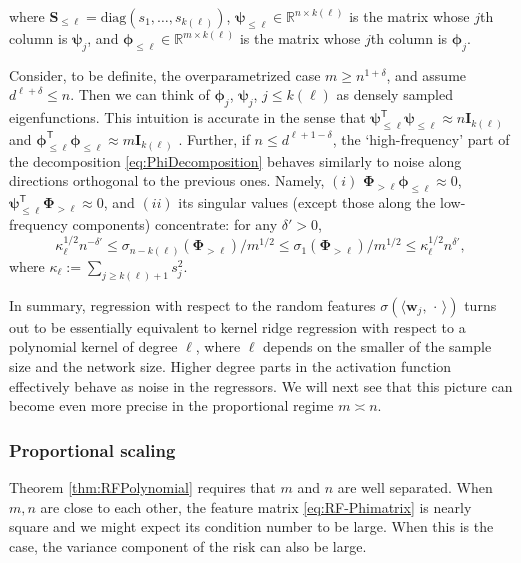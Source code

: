 where ${\boldsymbol S}_{\le \ell}= \text{diag}(s_1,\dots,s_{k(\ell)})$,
${\boldsymbol \psi}_{\le \ell}\in {\mathbb R}^{n\times k(\ell)}$ is the matrix whose $j$th column is ${\boldsymbol \psi}_j$, and ${\boldsymbol \phi}_{\le
\ell}\in {\mathbb R}^{m\times k(\ell)}$ is the matrix whose $j$th column is ${\boldsymbol \phi}_j$.

Consider, to be definite, the overparametrized case $m\ge n^{1+\delta}$, and assume $ d^{\ell+\delta}\le n$. Then we can think of ${\boldsymbol \phi}_j$, ${\boldsymbol \psi}_j$, $j\le k(\ell)$ as densely sampled eigenfunctions. This intuition is accurate  in the sense that
${\boldsymbol \psi}^{{\mathsf T}}_{\le
\ell}{\boldsymbol \psi}_{\le \ell}\approx n{\mathbf I}_{k(\ell)}$
and  ${\boldsymbol \phi}^{{\mathsf T}}_{\le \ell}{\boldsymbol \phi}_{\le \ell}\approx
m{\mathbf I}_{k(\ell)}$ \cite{mei2020generalization}. Further, if $n\le d^{\ell+1-\delta}$, the `high-frequency' part of the decomposition \eqref{eq:PhiDecomposition}
behaves similarly to noise along directions orthogonal to the previous ones. Namely, $(i)$
${\boldsymbol \Phi}_{>\ell}{\boldsymbol \phi}_{\le \ell}\approx 0$,
${\boldsymbol \psi}^{{\mathsf T}}_{\le \ell}{\boldsymbol \Phi}_{>\ell}\approx 0$, and $(ii)$ its singular values (except those along the low-frequency components) concentrate: for any $\delta'>0$, 
$$\kappa_{\ell}^{1/2} n^{-\delta'}\le\sigma_{n-k(\ell)}({\boldsymbol \Phi}_{>\ell})/m^{1/2}\le
\sigma_{1}({\boldsymbol \Phi}_{>\ell})/m^{1/2}\le \kappa_{\ell}^{1/2} n^{\delta'},$$
where $\kappa_{\ell}:=\sum_{j\ge k(\ell)+1}s_{j}^2$.

In summary, regression with respect to the random features $\sigma(\langle{\boldsymbol w}_{j},\,\cdot\,\rangle)$ turns out to be essentially equivalent to kernel ridge regression with respect to a polynomial kernel of degree $\ell$,
where $\ell$ depends on the smaller of the sample size and the network size. Higher degree parts in the activation function effectively behave as noise in the regressors. We will next see that this picture can become even more precise in the proportional regime $m\asymp n$.

\subsubsection{Proportional scaling}
\label{sec:RF_Proportional}

Theorem \ref{thm:RFPolynomial} requires that $m$ and $n$ are well separated. When $m,n$ are close to each other, the feature matrix \eqref{eq:RF-Phimatrix} is nearly square and we might expect its condition number to be large. When this is the case, the variance component of the risk can also be large.

